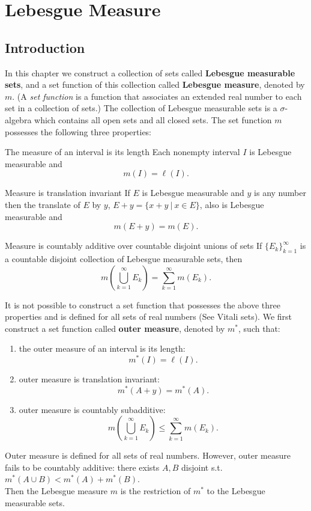\chapter{Lebesgue Measure}

\section{Introduction}
In this chapter we construct a collection of sets called \textbf{Lebesgue measurable sets}, and a set function of this collection called \textbf{Lebesgue measure}, denoted by $m$. 
(A \textit{set function} is a function that associates an extended real number to each set in a collection of sets.)
The collection of Lebesgue measurable sets is a $\sigma$-algebra which contains all open sets and all closed sets. The set function $m$ possesses the following three properties:
\begin{namedthm*}{The measure of an interval is its length}
Each nonempty interval $I$ is Lebesgue measurable and 
\[
m(I) = \ell(I).
\]
\end{namedthm*}
\begin{namedthm*}{Measure is translation invariant}
If $E$ is Lebesgue measurable and $y$ is any number then the translate of $E$ by $y$, $E+y = \{x+y \ |\ x \in E\}$, also is Lebesgue measurable and
\[
m(E+y) = m(E).
\]
\end{namedthm*}
\begin{namedthm*}{Measure is countably additive over countable disjoint unions of sets}
If $\{E_k\}_{k=1}^\infty$ is a countable disjoint collection of Lebesgue measurable sets, then
\[
m(\bigcup_{k=1}^\infty E_k) = \sum_{k=1}^\infty m(E_k).
\]
\end{namedthm*}
It is not possible to construct a set function that possesses the above three properties and is defined for all sets of real numbers (See Vitali sets).
We first construct a set function called \textbf{outer measure}, denoted by $m^*$, such that: 
\begin{enumerate}[label=(\roman*),align=left]
	\item the outer measure of an interval is its length:
	\[
		m^*(I)=\ell(I).
	\]
	\item outer measure is translation invariant:
	\[
		m^*(A+y)=m^*(A).
	\]
	\item outer measure is countably subadditive:
	\[
		m(\bigcup_{k=1}^\infty E_k) \le \sum_{k=1}^\infty m(E_k).
	\]
\end{enumerate}
Outer measure is defined for all sets of real numbers.
However, outer measure fails to be countably additive: there exists $A,B$ disjoint s.t. $m^*(A\cup B)<m^*(A)+m^*(B)$.\\
Then the Lebesgue measure $m$ is the restriction of $m^*$ to the Lebesgue measurable sets.

